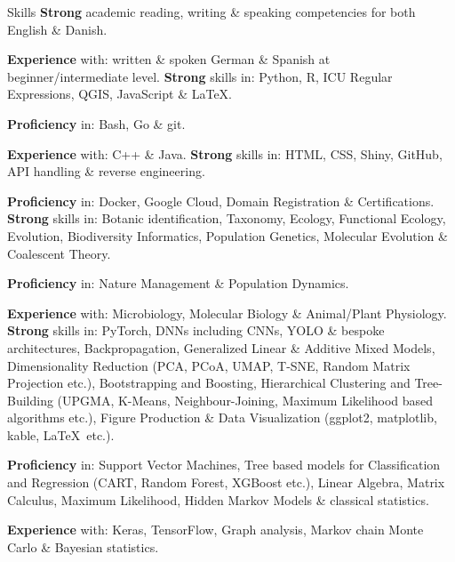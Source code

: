
\begin{rubric}{Skills}
%
	\textbf{Strong} academic reading, writing \& speaking competencies for both English \& Danish.\par
    \textbf{Experience} with: 
    written \& spoken German \& Spanish at beginner/intermediate level.
%
%
	\textbf{Strong} skills in:
    Python, R, ICU Regular Expressions, QGIS, JavaScript \& \LaTeX.\par
    \textbf{Proficiency} in:
    Bash, Go \& git.\par
    \textbf{Experience} with:
    C++ \& Java.
%
%
	\textbf{Strong} skills in:
    HTML, CSS, Shiny, GitHub, API handling \& reverse engineering.\par 
    \textbf{Proficiency} in:
    Docker, Google Cloud, Domain Registration \& Certifications.
%
%
    \textbf{Strong} skills in:
    Botanic identification, Taxonomy, Ecology, Functional Ecology, Evolution, Biodiversity Informatics, Population Genetics, Molecular Evolution \& Coalescent Theory.\par
    \textbf{Proficiency} in:
    Nature Management \& Population Dynamics.\par
    \textbf{Experience} with:
     Microbiology, Molecular Biology \& Animal/Plant Physiology.
%
%
    \textbf{Strong} skills in:
    PyTorch, DNNs including CNNs, YOLO \& bespoke architectures, Backpropagation, Generalized Linear \& Additive Mixed Models, Dimensionality Reduction (PCA, PCoA, UMAP, T-SNE, Random Matrix Projection etc.), Bootstrapping and Boosting, Hierarchical Clustering and Tree-Building (UPGMA, K-Means, Neighbour-Joining, Maximum Likelihood based algorithms etc.), Figure Production \& Data Visualization (ggplot2, matplotlib, kable, \LaTeX\, etc.).\par
    \textbf{Proficiency} in:
    Support Vector Machines, Tree based models for Classification and Regression (CART, Random Forest, XGBoost etc.), Linear Algebra, Matrix Calculus, Maximum Likelihood, Hidden Markov Models \& classical statistics.\par
    \textbf{Experience} with:
    Keras, TensorFlow, Graph analysis, Markov chain Monte Carlo \& Bayesian statistics.
\end{rubric}
